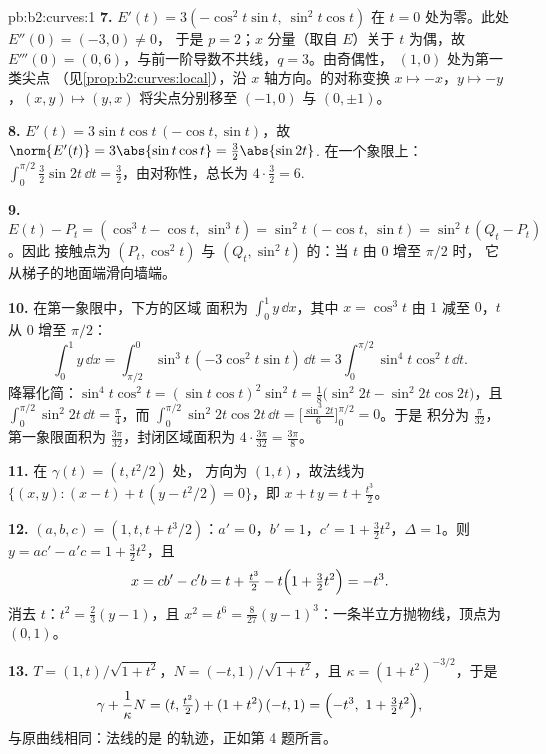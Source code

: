 \begin{solution}{pb:b2:curves:1}
\textbf{7.} $E'(t) = 3(-\cos^2 t\sin t,\ \sin^2 t\cos t)$
在 $t = 0$ 处为零。此处 $E''(0) = (-3, 0) \neq 0$，
于是 $p = 2$；$x$ 分量（取自 $E$）关于 $t$ 为偶，故
$E'''(0) = (0, 6)$，与前一阶导数不共线，$q = 3$。由奇偶性，
$(1, 0)$ 处为第一类尖点
（见\cref{prop:b2:curves:local}），沿
$x$ 轴方向。的对称变换 $x \mapsto -x$，$y \mapsto -y$，$(x,
y) \mapsto (y, x)$ 将尖点分别移至 $(-1,
0)$ 与 $(0, \pm1)$。

\textbf{8.} $E'(t) = 3\sin t\cos t\,(-\cos t, \sin t)$，故
$\norm{E'(t)} = 3\abs{\sin t\cos t} = \tfrac32\abs{\sin 2t}$.
在一个象限上：$\int_0^{\pi/2}\tfrac32\sin 2t\,\dd t =
\tfrac32$，由对称性，总长为 $4 \cdot
\tfrac32 = 6$.

\textbf{9.} $E(t) - P_t = (\cos^3 t - \cos t,\ \sin^3 t) =
\sin^2 t\,(-\cos t,\ \sin t) = \sin^2 t\,(Q_t - P_t)$。因此
接触点为 $(P_t, \cos^2 t)$ 与
$(Q_t, \sin^2 t)$ 的：当 $t$ 由 $0$ 增至 $\pi/2$ 时，
它从梯子的地面端滑向墙端。

\textbf{10.} 在第一象限中，下方的区域
面积为 $\int_0^1 y\,\dd x$，其中 $x = \cos^3 t$
由 $1$ 减至 $0$，$t$ 从 $0$ 增至 $\pi/2$：
\[
\int_0^1 y\,\dd x
= \int_{\pi/2}^{0}\sin^3 t\,(-3\cos^2 t\sin t)\,\dd t
= 3\int_0^{\pi/2}\sin^4 t\cos^2 t\,\dd t .
\]
降幂化简：$\sin^4 t\cos^2 t = (\sin t\cos t)^2\sin^2 t =
\tfrac18\bigl(\sin^2 2t - \sin^2 2t\cos 2t\bigr)$，且
$\int_0^{\pi/2}\sin^2 2t\,\dd t = \tfrac\pi4$，而
$\int_0^{\pi/2}\sin^2 2t\cos 2t\,\dd t =
\bigl[\tfrac{\sin^3 2t}6\bigr]_0^{\pi/2} = 0$。于是
积分为 $\tfrac\pi{32}$，第一象限面积为
$\tfrac{3\pi}{32}$，封闭区域面积为 $4 \cdot
\tfrac{3\pi}{32} = \tfrac{3\pi}8$。

\textbf{11.} 在 $\gamma(t) = (t, t^2/2)$ 处，
方向为 $(1, t)$，故法线为 $\{(x, y) : (x -
t) + t\,(y - t^2/2) = 0\}$，即 $x + t\,y = t +
\tfrac{t^3}2$。

\textbf{12.} $(a, b, c) = (1, t, t + t^3/2)$：$a' = 0$，$b' =
1$，$c' = 1 + \tfrac32 t^2$，$\Delta = 1$。则 $y = ac' -
a'c = 1 + \tfrac32t^2$，且
\[
x = cb' - c'b = t + \tfrac{t^3}2 - t\Bigl(1 +
\tfrac32t^2\Bigr) = -t^3 .
\]
消去 $t$：$t^2 = \tfrac23(y - 1)$，且 $x^2 = t^6 =
\tfrac8{27}(y - 1)^3$：一条半立方抛物线，顶点为
$(0, 1)$。

\textbf{13.} $T = (1, t)/\sqrt{1+t^2}$，$N = (-t,
1)/\sqrt{1+t^2}$，且 $\kappa = (1+t^2)^{-3/2}$，于是
\[
\gamma + \frac1\kappa N = (t, \tfrac{t^2}2) +
(1+t^2)\,(-t, 1) = \Bigl(-t^3,\ 1 + \tfrac32t^2\Bigr),
\]
与原曲线相同：法线的是
的轨迹，正如第 4 题所言。


\end{solution}
